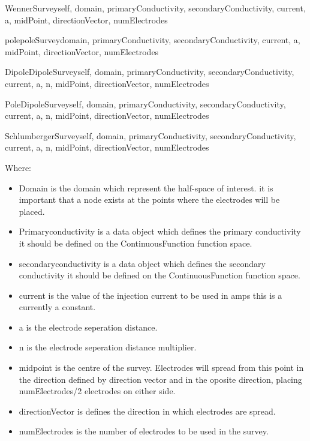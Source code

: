 \begin{classdesc}{WennerSurvey}{self, domain, primaryConductivity, secondaryConductivity,
current, a, midPoint, directionVector, numElectrodes}
\end{classdesc}

\begin{classdesc}{polepoleSurvey}{domain, primaryConductivity, secondaryConductivity, 
current, a, midPoint, directionVector, numElectrodes}
\end{classdesc}

\begin{classdesc}{DipoleDipoleSurvey}{self, domain, primaryConductivity, secondaryConductivity,
current, a, n, midPoint, directionVector, numElectrodes}
\end{classdesc}

\begin{classdesc}{PoleDipoleSurvey}{self, domain, primaryConductivity, secondaryConductivity,
current, a, n, midPoint, directionVector, numElectrodes}
\end{classdesc}

\begin{classdesc}{SchlumbergerSurvey}{self, domain, primaryConductivity, secondaryConductivity,
current, a, n, midPoint, directionVector, numElectrodes}
\end{classdesc}

\noindent Where:
\begin{itemize}
\item Domain is the domain which represent the half-space of interest. 
it is important that a node exists at the points where the electrodes will be placed.
\item Primaryconductivity is a data object which defines the primary conductivity
it should be defined on the ContinuousFunction function space.
\item secondaryconductivity is a data object which defines the secondary conductivity
it should be defined on the ContinuousFunction function space.
\item current is the value of the injection current to be used in amps this is a currently a
constant.
\item a is the electrode seperation distance.
\item n is the electrode seperation distance multiplier.
\item midpoint is the centre of the survey. Electrodes will spread from this point
in the direction defined by direction vector and in the oposite direction, placing
numElectrodes/2 electrodes on either side.
\item directionVector is defines the direction in which electrodes are spread.
\item numElectrodes is the number of electrodes to be used in the survey.
\end{itemize} 

